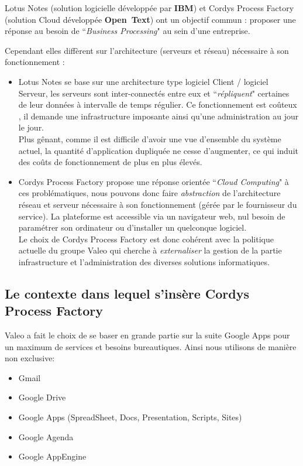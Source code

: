 Lotus Notes (solution logicielle développée par \textbf{IBM}) et Cordys Process Factory (solution Cloud développée \textbf{Open~Text}) ont un objectif commun : proposer une réponse au  besoin de ``\textit{Business Processing}" au sein d'une entreprise.

Cependant elles diffèrent sur l'architecture (serveurs et réseau) nécessaire à son fonctionnement :

\begin{itemize}
		\item Lotus Notes se base sur une architecture type logiciel Client / logiciel Serveur, les serveurs sont inter-connectés entre eux et ``\textit{répliquent}" certaines de leur données à intervalle de temps régulier. Ce fonctionnement est coûteux , il demande une infrastructure imposante ainsi qu'une administration au jour le jour. \\
		Plus gênant, comme il est difficile d'avoir une vue d'ensemble du système actuel, la quantité d'application dupliquée ne cesse d'augmenter, ce qui induit des coûts de fonctionnement de plus en plus élevés.\\

	\item Cordys Process Factory propose une réponse orientée ``\textit{Cloud Computing}" à ces problématiques, nous pouvons donc faire \textit{abstraction} de l'architecture réseau et serveur nécessaire à son fonctionnement (gérée par le fournisseur du service). La plateforme est accessible via un navigateur web, nul besoin de paramétrer son ordinateur ou d'installer un quelconque logiciel.\\
	Le choix de Cordys Process Factory est donc cohérent avec la politique actuelle du groupe Valeo qui cherche à \emph{externaliser} la gestion de la partie infrastructure et l'administration des diverses solutions informatiques.\\
	\end{itemize}


\subsection{Le contexte dans lequel s'insère Cordys Process Factory}

Valeo a fait le choix de se baser en grande partie sur la suite Google Apps pour un maximum de services et besoins bureautiques. Ainsi nous utilisons de manière non exclusive: 

	\begin{itemize}
		\item Gmail
		\item Google Drive
		\item Google Apps (SpreadSheet, Docs, Presentation, Scripts, Sites)
		\item Google Agenda 
		\item Google AppEngine
	\end{itemize}

